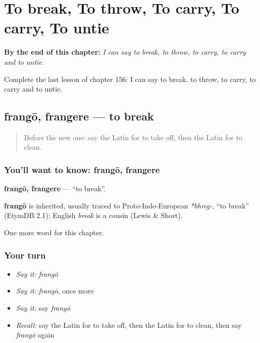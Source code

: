 
\chapter{To break, To throw, To carry, To carry, To untie}
\label{ch:la-to-break-to-throw-to-carry-to-carry-to-untie}

\begin{chapteropening}
\textbf{By the end of this chapter:} \emph{I can say to break, to throw, to carry, to carry and to untie.}

Complete the last lesson of chapter 156: I can say to break, to throw, to carry, to carry and to untie.
\end{chapteropening}

\section[frangō, frangere]{frangō, frangere — to break}

\label{lesson:LA-C156-frango}



\begin{quote}
Before the new one: say the Latin for to take off, then the Latin for to clean.
\end{quote}

\subsection*{You'll want to know: frangō, frangere}
\textbf{frangō, frangere} — \textquotedblleft{}to break\textquotedblright{}.

\begin{cousinweb}
\textbf{frangō} is inherited, usually traced to Proto-Indo-European \emph{*bhreg-}, \textquotedblleft{}to break\textquotedblright{} (EtymDB 2.1); English \emph{break} is a cousin (Lewis \& Short).
\end{cousinweb}

\begin{grammarlens}[title={What you've built}]
One more word for this chapter.
\end{grammarlens}

\subsection*{Your turn}
\begin{itemize}
\raggedright
  \item \emph{Say it:} \emph{frangō}
  \item \emph{Say it:} \emph{frangō}, once more
  \item \emph{Say it:} say \emph{frangō}
  \item \emph{Recall:} say the Latin for to take off, then the Latin for to clean, then say \emph{frangō} again
\end{itemize}

